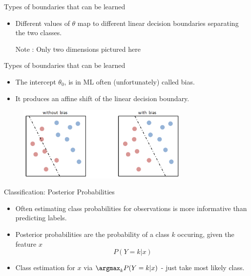 \begin{frame} {Types of boundaries that can be learned}
  \begin{itemize}
    \item Different values of $\theta$ map to different linear decision boundaries separating the two classes.
    \vspace{5mm}
    \begin{figure}
    \centering
  \end{figure}
    \vspace{5mm}
  Note : Only two dimensions pictured here
  \end{itemize}
\end{frame}

\begin{frame} {Types of boundaries that can be learned}
\begin{itemize}
  \item The intercept $\theta_0$, is in ML often (unfortunately) called bias.
  \item It produces an affine shift of the linear decision boundary.
\end{itemize}

\begin{figure}
    \centering
    \includegraphics[width=8.5cm]{plots/bias.png}
\end{figure}
\end{frame}


\begin{frame}{Classification: Posterior Probabilities}

\begin{itemize}
\item
  Often estimating class probabilities for observations is more
  informative than predicting labels.
\item
  Posterior probabilities are the probability of a class \(k\) occuring,
  given the feature \(x\) \[
  P(Y = k | x)
  \]
\item
  Class estimation for \(x\) via \(\argmax_{k}    P(Y = k | x) \) - just take most
  likely class.
\end{itemize}

\end{frame}

